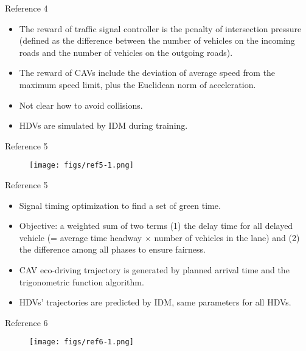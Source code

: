 \documentclass[9pt]{beamer}
\begin{document}
\begin{frame}{Reference 4}
\cite{guo2023cotv}
\begin{itemize}
\item The reward of traffic signal controller is the penalty of intersection pressure (defined as the difference between the number of vehicles on the incoming roads and the number of vehicles on the outgoing roads).
\item The reward of CAVs include the deviation of
average speed from the maximum speed limit, plus the Euclidean norm of acceleration.
\item Not clear how to avoid collisions.
\item HDVs are simulated by IDM during training.
\end{itemize}
\end{frame}

\begin{frame}{Reference 5}
\cite{du2021coupled}
\begin{figure}
\texttt{[image: figs/ref5-1.png]}
\end{figure}
\end{frame}

\begin{frame}{Reference 5}
\cite{du2021coupled}

\begin{itemize}
\item Signal timing optimization to find a set of green time. 
\item Objective: a weighted sum of two terms (1) the delay time for all delayed vehicle (= average time headway $\times$ number of vehicles in the lane) and (2) the difference among all phases to ensure fairness.
\item CAV eco-driving trajectory is generated by planned arrival time and the trigonometric function algorithm.
\item HDVs' trajectories are predicted by IDM, same parameters for all HDVs.
\end{itemize}

\end{frame}

\begin{frame}{Reference 6}
\cite{tajalli2021traffic}
\begin{figure}
\texttt{[image: figs/ref6-1.png]}
\end{figure}
\end{frame}
\end{document}
